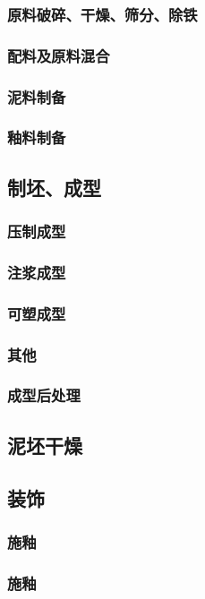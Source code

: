 \documentclass[UTF8]{../../ApplicationUniverse}
\begin{document}
        \subsubsection{原料破碎、干燥、筛分、除铁}
        \subsubsection{配料及原料混合}
        \subsubsection{泥料制备}
        \subsubsection{釉料制备}
    \subsection{制坯、成型}
        \subsubsection{压制成型}
        \subsubsection{注浆成型}
        \subsubsection{可塑成型}
        \subsubsection{其他}
        \subsubsection{成型后处理}
    \subsection{泥坯干燥}
    \subsection{装饰}
        \subsubsection{施釉}
        \subsubsection{施釉}
\end{document}
